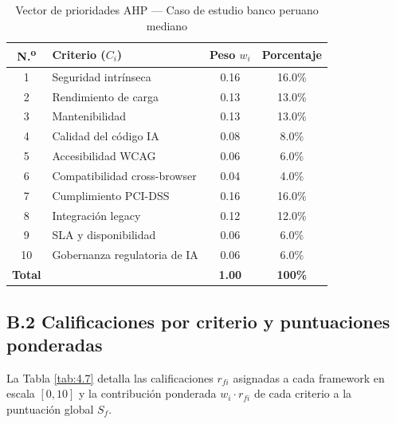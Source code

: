 \begin{table}[htbp]
\centering
\caption{Vector de prioridades AHP --- Caso de estudio banco peruano mediano}
\label{tab:4.6}
\small
\begin{tabular}{@{}clcc@{}}
\toprule
N.\textsuperscript{o} & Criterio ($C_i$) & Peso $w_i$ & Porcentaje \\
\midrule
1  & Seguridad intrínseca          & 0.16 & 16.0\% \\
2  & Rendimiento de carga          & 0.13 & 13.0\% \\
3  & Mantenibilidad                & 0.13 & 13.0\% \\
4  & Calidad del código IA         & 0.08 & 8.0\%  \\
5  & Accesibilidad WCAG            & 0.06 & 6.0\%  \\
6  & Compatibilidad cross-browser  & 0.04 & 4.0\%  \\
7  & Cumplimiento PCI-DSS          & 0.16 & 16.0\% \\
8  & Integración legacy            & 0.12 & 12.0\% \\
9  & SLA y disponibilidad          & 0.06 & 6.0\%  \\
10 & Gobernanza regulatoria de IA  & 0.06 & 6.0\%  \\
\midrule
\textbf{Total} & & \textbf{1.00} & \textbf{100\%} \\
\bottomrule
\end{tabular}
\end{table}

\subsection*{B.2 Calificaciones por criterio y puntuaciones ponderadas}

La Tabla \ref{tab:4.7} detalla las calificaciones $r_{fi}$ asignadas a cada
framework en escala $[0,10]$ y la contribución ponderada $w_i \cdot r_{fi}$ de
cada criterio a la puntuación global $S_f$.


